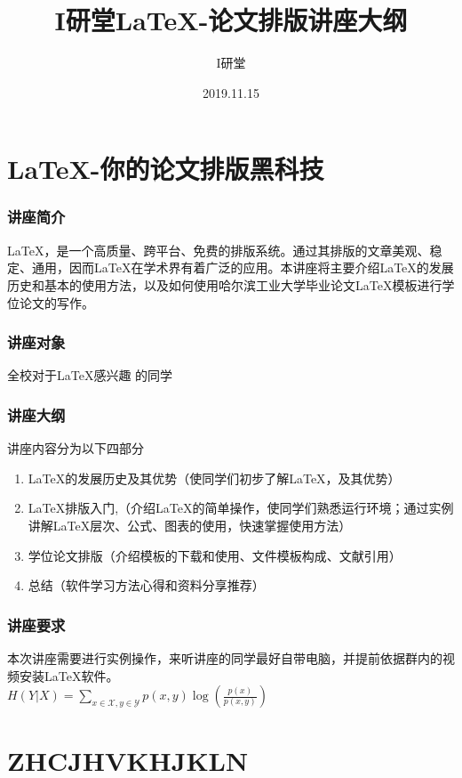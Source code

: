 \documentclass[UTF8]{ctexbook}
\begin{document}
	
\title{I研堂LaTeX-论文排版讲座大纲}
\author{I研堂}
\date{2019.11.15}
\maketitle
 \tableofcontents 

\chapter{\LaTeX -你的论文排版黑科技}
\subsection{讲座简介}
  \LaTeX，是一个高质量、跨平台、免费的排版系统。通过其排版的文章美观、稳定、通用，因而\LaTeX 在学术界有着广泛的应用。本讲座将主要介绍\LaTeX 的发展历史和基本的使用方法，以及如何使用哈尔滨工业大学毕业论文\LaTeX 模板进行学位论文的写作。
\subsection{讲座对象}全校对于LaTeX感兴趣
的同学
\subsection{讲座大纲}讲座内容分为以下四部分
\begin{enumerate}
	\item \LaTeX 的发展历史及其优势（使同学们初步了解\LaTeX ，及其优势）\\
	\item \LaTeX 排版入门,（介绍\LaTeX 的简单操作，使同学们熟悉运行环境；通过实例讲解\LaTeX 层次、公式、图表的使用，快速掌握使用方法）\\
	\item 学位论文排版（介绍模板的下载和使用、文件模板构成、文献引用）\\
	\item 总结（软件学习方法心得和资料分享推荐）\\
\end{enumerate}
\subsection{讲座要求}本次讲座需要进行实例操作，来听讲座的同学最好自带电脑，并提前依据群内的视频安装\LaTeX 软件。\\

$H(Y | X)=\sum_{x \in \mathcal{X}, y \in \mathcal{Y}} p(x, y) \log \left(\frac{p(x)}{p(x, y)}\right)$
\chapter{ZHCJHVKHJKLN}
\end{document}
